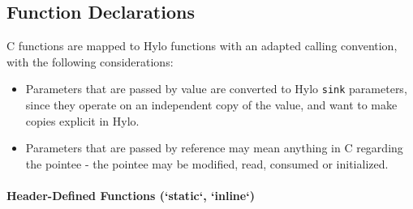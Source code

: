 \subsection{Function Declarations}
C functions are mapped to Hylo functions with an adapted calling convention, with the following considerations:
\begin{itemize}
    \item Parameters that are passed by value are converted to Hylo \texttt{sink} parameters, since they operate on an independent copy of the value, and want to make copies explicit in Hylo.
    \item Parameters that are passed by reference may mean anything in C regarding the pointee - the pointee may be modified, read, consumed or initialized.
\end{itemize}

\paragraph{Header-Defined Functions (`static`, `inline`)}
\label{handling_inline_c_functions}

